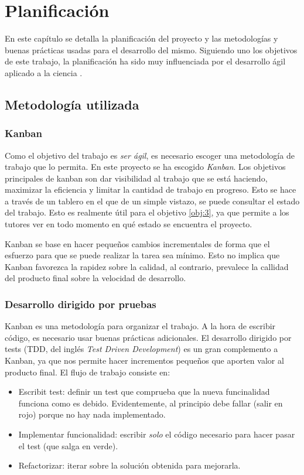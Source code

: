 \chapter{Planificación}

En este capítulo se detalla la planificación del proyecto y las metodologías y buenas prácticas
usadas para el desarrollo del mismo. Siguiendo uno los objetivos de este trabajo, la planificación
ha sido muy influenciada por el desarrollo ágil aplicado a la ciencia \cite{desarrolloagil}.

\section{Metodología utilizada}

\subsection{Kanban}

Como el objetivo del trabajo es \textit{ser ágil}, es necesario escoger una metodología de trabajo que
lo permita. En este proyecto se ha escogido \textit{Kanban}. Los objetivos principales de kanban son dar
visibilidad al trabajo que se está haciendo, maximizar la eficiencia y limitar la cantidad de trabajo
en progreso. Esto se hace a través de un tablero en el que de un simple vistazo, se puede consultar el
estado del trabajo. Esto es realmente útil para el objetivo \ref{obj:3}, ya que permite a los tutores
ver en todo momento en qué estado se encuentra el proyecto.

Kanban se base en hacer pequeños cambios incrementales de forma que el esfuerzo para que se puede realizar
la tarea sea mínimo. Esto no implica que Kanban favorezca la rapidez sobre la calidad, al contrario,
prevalece la callidad del producto final sobre la velocidad de desarrollo.

\subsection{Desarrollo dirigido por pruebas}

Kanban es una metodología para organizar el trabajo. A la hora de escribir código, es necesario usar
buenas prácticas adicionales. El desarrollo dirigido por tests (TDD, del inglés \textit{Test Driven Development})
es un gran complemento a Kanban, ya que nos permite hacer incrementos pequeños que aporten valor al
producto final. El flujo de trabajo consiste en:

\begin{itemize}
    \item Escribit test: definir un test que comprueba que la nueva funcinalidad funciona como es debido.
          Evidentemente, al principio debe fallar (salir en rojo) porque no hay nada implementado.
    \item Implementar funcionalidad: escribir \textit{solo} el código necesario para hacer pasar el test
          (que salga en verde).
    \item Refactorizar: iterar sobre la solución obtenida para mejorarla.
\end{itemize}

